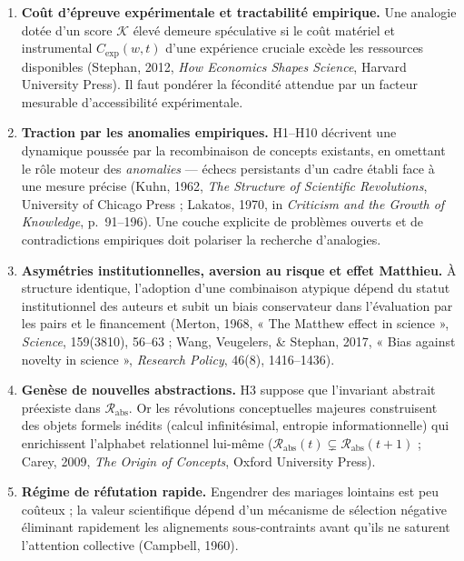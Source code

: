 \documentclass[a4paper,11pt]{article}
\providecommand{\tightlist}{\setlength{\itemsep}{0pt}\setlength{\parskip}{0pt}}
\begin{document}
\begin{enumerate}
\def\labelenumi{\arabic{enumi}.}
\tightlist
\item
  \textbf{Coût d'épreuve expérimentale et tractabilité empirique.} Une
  analogie dotée d'un score \(\mathcal{K}\) élevé demeure spéculative si
  le coût matériel et instrumental \(C_{\text{exp}}(w, t)\) d'une
  expérience cruciale excède les ressources disponibles (Stephan, 2012,
  \emph{How Economics Shapes Science}, Harvard University Press). Il
  faut pondérer la fécondité attendue par un facteur mesurable
  d'accessibilité expérimentale.
\item
  \textbf{Traction par les anomalies empiriques.} H1--H10 décrivent une
  dynamique poussée par la recombinaison de concepts existants, en
  omettant le rôle moteur des \emph{anomalies} --- échecs persistants
  d'un cadre établi face à une mesure précise (Kuhn, 1962, \emph{The
  Structure of Scientific Revolutions}, University of Chicago Press ;
  Lakatos, 1970, in \emph{Criticism and the Growth of Knowledge},
  p.~91--196). Une couche explicite de problèmes ouverts et de
  contradictions empiriques doit polariser la recherche d'analogies.
\item
  \textbf{Asymétries institutionnelles, aversion au risque et effet
  Matthieu.} À structure identique, l'adoption d'une combinaison
  atypique dépend du statut institutionnel des auteurs et subit un biais
  conservateur dans l'évaluation par les pairs et le financement
  (Merton, 1968, « The Matthew effect in science », \emph{Science},
  159(3810), 56--63 ; Wang, Veugelers, \& Stephan, 2017, « Bias against
  novelty in science », \emph{Research Policy}, 46(8), 1416--1436).
\item
  \textbf{Genèse de nouvelles abstractions.} H3 suppose que l'invariant
  abstrait préexiste dans \(\mathcal{R}_{\text{abs}}\). Or les
  révolutions conceptuelles majeures construisent des objets formels
  inédits (calcul infinitésimal, entropie informationnelle) qui
  enrichissent l'alphabet relationnel lui-même
  (\(\mathcal{R}_{\text{abs}}(t) \subsetneq \mathcal{R}_{\text{abs}}(t+1)\)
  ; Carey, 2009, \emph{The Origin of Concepts}, Oxford University
  Press).
\item
  \textbf{Régime de réfutation rapide.} Engendrer des mariages lointains
  est peu coûteux ; la valeur scientifique dépend d'un mécanisme de
  sélection négative éliminant rapidement les alignements
  sous-contraints avant qu'ils ne saturent l'attention collective
  (Campbell, 1960).
\end{enumerate}
\end{document}
